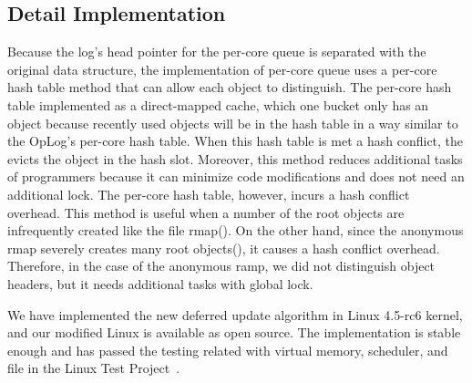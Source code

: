 \subsection{Detail Implementation}
Because the log's head pointer for the per-core queue is
separated with the original data structure, the implementation of
per-core queue uses 
a per-core hash table method that can allow each object to distinguish.
The per-core hash table implemented as a direct-mapped cache, which one
bucket only has an object because recently used objects will be in the hash
table in a way similar to the OpLog's per-core hash table.
When this hash table is met a hash conflict, the \LDU evicts the object in the
hash slot.
Moreover, this method reduces additional tasks of programmers because it can
minimize code modifications and does not need an additional lock.
The per-core hash table, however, incurs a hash conflict overhead.
This method is useful when a number of the root objects are infrequently created like the 
file rmap().
On the other hand, since the anonymous rmap severely creates many
root objects(), it causes a hash conflict overhead.
Therefore, in the case of the anonymous ramp, we did not distinguish object
headers, but it needs additional tasks with global lock.

We have implemented the new deferred update algorithm in Linux 4.5-rc6 kernel,
and our modified Linux is available as open source. 
The implementation is stable enough and has passed the testing
related with virtual memory, scheduler,
and file in the Linux Test Project~\cite{LTP}.
